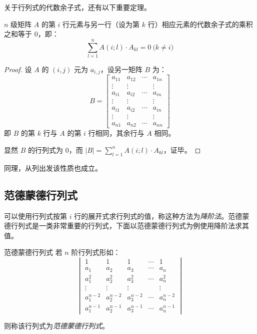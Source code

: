 关于行列式的代数余子式，还有以下重要定理。

\begin{theorem}
	$n$ 级矩阵 $A$ 的第 $i$ 行元素与另一行（设为第 $k$ 行）相应元素的代数余子式的乘积之和等于 $0$，即：
	$$
	\sum\limits_{l = 1}^n A(i; l) \cdot A_{kl} = 0 \pod{k \ne i}
	$$
\end{theorem}

\begin{proof}
	设 $A$ 的 $(i, j)$ 元为 $a_{i, j}$，设另一矩阵 $B$ 为：
	$$
	B =
	\begin{bmatrix}
		a_{11} & a_{12} & \cdots & a_{1n}
		\\
		\vdots & \vdots & & \vdots
		\\
		a_{i1} & a_{i2} & \cdots & a_{in}
		\\
		\vdots & \vdots & & \vdots
		\\
		a_{i1} & a_{i2} & \cdots & a_{in}
		\\
		\vdots & \vdots & & \vdots
		\\
		a_{n1} & a_{n2} & \cdots & a_{nn}
	\end{bmatrix}
	$$
	即 $B$ 的第 $k$ 行与 $A$ 的第 $i$ 行相同，其余行与 $A$ 相同。

	显然 $B$ 的行列式为 $0$，而 $|B| = \sum\limits_{l = 1}^n A(i; l) \cdot A_{kl}$，证毕。
\end{proof}

同理，从列出发该性质也成立。

\subsection{范德蒙德行列式}

可以使用行列式按第 $i$ 行的展开式求行列式的值，称这种方法为\emph{降阶法}。范德蒙德行列式是一类非常重要的行列式，下面以范德蒙德行列式为例使用降阶法求其值。

\begin{definition}{范德蒙德行列式}
	若 $n$ 阶行列式形如：
	$$
	\begin{vmatrix}
		1 & 1 & 1 & \cdots & 1
		\\
		a_1 & a_2 & a_3 & \cdots & a_n
		\\
		a_1^2 & a_2^2 & a_3^2 & \cdots & a_n^2
		\\
		\vdots & \vdots & \vdots & & \vdots
		\\
		a_1^{n - 2} & a_2^{n - 2} & a_3^{n - 2} & \cdots & a_n^{n - 2}
		\\
		a_1^{n - 1} & a_2^{n - 1} & a_3^{n - 1} & \cdots & a_n^{n - 1}
	\end{vmatrix}
	$$

	则称该行列式为\emph{范德蒙德行列式}。
\end{definition}

